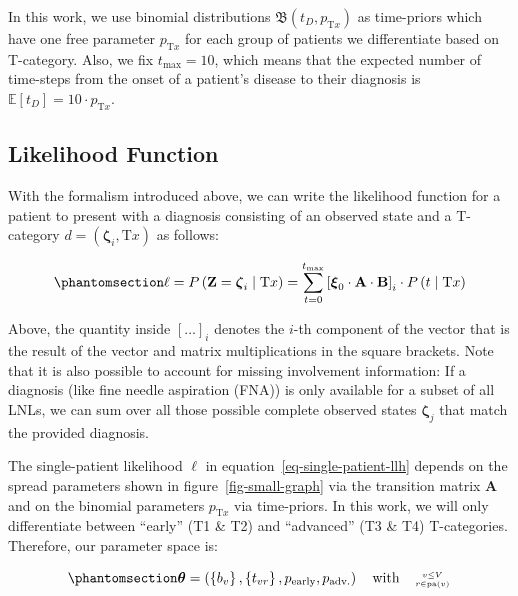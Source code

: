 \documentclass[
  sn-mathphys-num,
]{sn-jnl}
\begin{document}
In this work, we use binomial distributions
\(\mathfrak{B} \left( t_D, p_{\text{T}x} \right)\) as time-priors which
have one free parameter \(p_{\text{T}x}\) for each group of patients we
differentiate based on T-category. Also, we fix \(t_\text{max} = 10\),
which means that the expected number of time-steps from the onset of a
patient's disease to their diagnosis is
\(\mathbb{E}\left[ t_D \right] = 10 \cdot p_{\text{T}x}\).

\subsection{Likelihood Function}\label{likelihood-function}

With the formalism introduced above, we can write the likelihood
function for a patient to present with a diagnosis consisting of an
observed state and a T-category
\(d = \left( \boldsymbol{\zeta}_i, \text{T}x \right)\) as follows:

\begin{equation}\phantomsection\label{eq-single-patient-llh}{
\ell = P \left( \mathbf{Z} = \boldsymbol{\zeta}_i \mid \text{T}x \right) = \sum_{t=0}^{t_\text{max}} \left[ \boldsymbol{\xi}_0 \cdot \mathbf{A} \cdot \mathbf{B} \right]_i \cdot P \left( t \mid \text{T}x \right)
}\end{equation}

Above, the quantity inside \(\left[ \ldots \right]_i\) denotes the
\(i\)-th component of the vector that is the result of the vector and
matrix multiplications in the square brackets. Note that it is also
possible to account for missing involvement information: If a diagnosis
(like fine needle aspiration (FNA)) is only available for a subset of
all LNLs, we can sum over all those possible complete observed states
\(\boldsymbol{\zeta}_j\) that match the provided diagnosis.

The single-patient likelihood \(\ell\) in
equation~\ref{eq-single-patient-llh} depends on the spread parameters
shown in figure~\ref{fig-small-graph} via the transition matrix
\(\mathbf{A}\) and on the binomial parameters \(p_{\text{T}x}\) via
time-priors. In this work, we will only differentiate between ``early''
(T1 \& T2) and ``advanced'' (T3 \& T4) T-categories. Therefore, our
parameter space is:

\begin{equation}\phantomsection\label{eq-param-space}{
\boldsymbol{\theta} = \left( \left\{ b_v \right\}, \left\{ t_{vr} \right\}, p_\text{early}, p_\text{adv.} \right) \quad \text{with} \quad \genfrac{}{}{0pt}{2}{v\leq V}{r\in\operatorname{pa}(v)}
}\end{equation}
\end{document}
